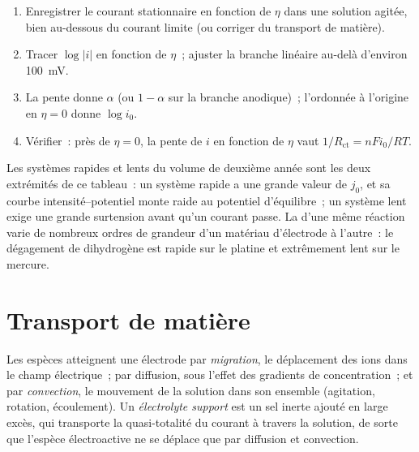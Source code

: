 \begin{method}\label{met:b3:electrode-kinetics:tafel-analysis}
\begin{enumerate}
  \item Enregistrer le courant stationnaire en fonction de $\eta$ dans une
        solution agitée, bien au-dessous du courant limite (ou corriger
        du transport de matière).
  \item Tracer $\log|i|$ en fonction de $\eta$~; ajuster la branche
        linéaire au-delà d'environ \qty{100}{mV}.
  \item La pente donne $\alpha$ (ou $1 - \alpha$ sur la branche
        anodique)~; l'ordonnée à l'origine en $\eta = 0$ donne $\log i_0$.
  \item Vérifier~: près de $\eta = 0$, la pente de $i$ en fonction de
        $\eta$ vaut $1/R_{\mathrm{ct}} = nFi_0/RT$.
\end{enumerate}
\end{method}

Les systèmes rapides et lents du volume de deuxième année sont les deux
extrémités de ce tableau~: un système rapide a une grande valeur de
$j_0$, et sa courbe intensité--potentiel monte raide au potentiel
d'équilibre~; un système lent exige une grande surtension avant qu'un
courant passe. La  d'une même réaction varie
de nombreux ordres de grandeur d'un matériau d'électrode à l'autre~: le
dégagement de dihydrogène est rapide sur le platine et extrêmement lent
sur le mercure.

\section{Transport de matière}

\begin{definition}\label{def:b3:electrode-kinetics:transport}
Les espèces atteignent une électrode par \emph{migration},
le déplacement des ions dans le champ électrique~; par diffusion, sous
l'effet des gradients de concentration~; et par
\emph{convection}, le mouvement de la solution dans son
ensemble (agitation, rotation, écoulement). Un \emph{électrolyte
support} est un sel inerte
ajouté en large excès, qui transporte la quasi-totalité du courant à
travers la solution, de sorte que l'espèce électroactive ne se déplace
que par diffusion et convection.
\end{definition}

